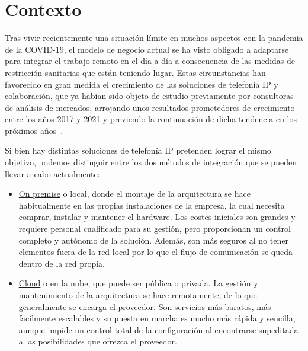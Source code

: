 \documentclass[a4paper, 12pt]{book}
\begin{document}
\section{Contexto}
Tras vivir recientemente una situación límite en muchos aspectos con la pandemia de la COVID-19, el modelo de negocio actual se ha visto obligado a adaptarse para integrar el trabajo remoto en el día a día a consecuencia de las medidas de restricción sanitarias que están teniendo lugar.
Estas circunstancias han favorecido en gran medida el crecimiento de las soluciones de telefonía IP y colaboración, que ya habían sido objeto de estudio previamente por consultoras de análisis de mercados, %
arrojando unos resultados prometedores de crecimiento entre los años 2017 y 2021 y previendo la continuación de dicha tendencia en los próximos años~\cite{researchandmarkets}.

Si bien hay distintas soluciones de telefonía IP pretenden lograr el mismo objetivo, podemos distinguir entre los dos métodos de integración que se pueden llevar a cabo actualmente:
\begin{itemize}
  \renewcommand{\theenumi}{\alph{enumi}}
  \item \underline{On premise} o local, donde el montaje de la arquitectura se hace habitualmente en las propias instalaciones de la empresa, la cual necesita comprar, instalar y mantener el hardware. Los costes iniciales son grandes y requiere personal cualificado para su gestión, pero proporcionan un control completo y autónomo de la solución. Además, son más seguros al no tener elementos fuera de la red local por lo que el flujo de comunicación se queda dentro de la red propia.  

  \item \underline{Cloud} o en la nube, que puede ser pública o privada. La gestión y mantenimiento de la arquitectura se hace remotamente, de lo que generalmente se encarga el proveedor. Son servicios más baratos, más facilmente escalables y su puesta en marcha es mucho más rápida y sencilla, aunque impide un control total de la configuración al encontrarse supeditada a las posibilidades que ofrezca el proveedor.
\end{itemize}
\end{document}
